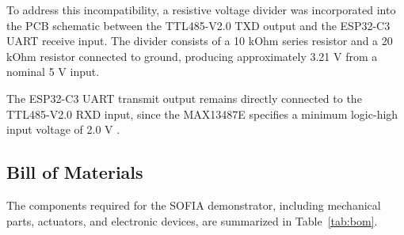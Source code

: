 \documentclass[lettersize,journal]{IEEEtran}
\begin{document}
	To address this incompatibility, a resistive voltage
	divider was incorporated into the PCB schematic between
	the TTL485-V2.0 TXD output and the ESP32-C3 UART receive
	input. The divider consists of a 10 kOhm series resistor
	and a 20 kOhm resistor connected to ground, producing
	approximately 3.21 V from a nominal 5 V input.
	
	The ESP32-C3 UART transmit output remains directly
	connected to the TTL485-V2.0 RXD input, since the
	MAX13487E specifies a minimum logic-high input voltage
	of 2.0 V \cite{max13487e}.
	
	
	\subsection{Bill of Materials}
	The components required for the SOFIA demonstrator,
	including mechanical parts, actuators, and electronic
	devices, are summarized in Table~\ref{tab:bom}.
	
	
	
\end{document}
